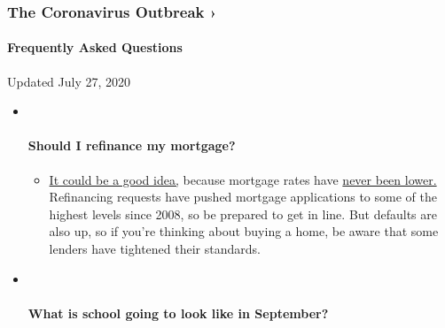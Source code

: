 \hypertarget{the-coronavirus-outbreak-}{%
\subsubsection{The Coronavirus Outbreak
›}\label{the-coronavirus-outbreak-}}

\hypertarget{frequently-asked-questions}{%
\paragraph{Frequently Asked
Questions}\label{frequently-asked-questions}}

Updated July 27, 2020

\begin{itemize}
\item ~
  \hypertarget{should-i-refinance-my-mortgage}{%
  \paragraph{Should I refinance my
  mortgage?}\label{should-i-refinance-my-mortgage}}

  \begin{itemize}
  \tightlist
  \item
    \href{https://www.nytimes3xbfgragh.onion/article/coronavirus-money-unemployment.html?action=click\&pgtype=Article\&state=default\&region=MAIN_CONTENT_3\&context=storylines_faq}{It
    could be a good idea,} because mortgage rates have
    \href{https://www.nytimes3xbfgragh.onion/2020/07/16/business/mortgage-rates-below-3-percent.html?action=click\&pgtype=Article\&state=default\&region=MAIN_CONTENT_3\&context=storylines_faq}{never
    been lower.} Refinancing requests have pushed mortgage applications
    to some of the highest levels since 2008, so be prepared to get in
    line. But defaults are also up, so if you're thinking about buying a
    home, be aware that some lenders have tightened their standards.
  \end{itemize}
\item ~
  \hypertarget{what-is-school-going-to-look-like-in-september}{%
  \paragraph{What is school going to look like in
  September?}\label{what-is-school-going-to-look-like-in-september}}


\end{itemize}

